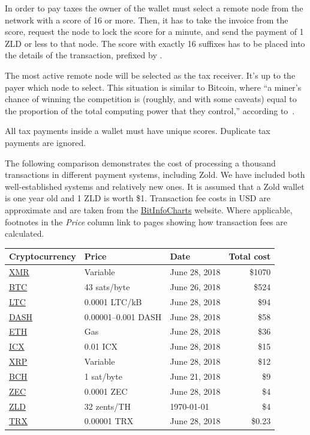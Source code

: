 \documentclass{main}
\begin{document}
In order to pay taxes the owner of the wallet must select a remote
node from the network with a score of 16 or more. Then, it has to
take the invoice from the score, request the node to lock the score
for a minute, and send the payment of 1 ZLD or less
to that node. The score with exactly 16 suffixes
has to be placed into the details of the transaction,
prefixed by .

The most active remote node will be selected as the tax receiver.
It's up to the payer which node to select. This situation is similar
to Bitcoin, where ``a miner's chance of winning the
competition is (roughly, and with some caveats) equal to the proportion of the total computing
power that they control,'' according to~\textcite{foroglou2015}.

All tax payments inside a wallet must have unique scores.
Duplicate tax payments are ignored.

The following comparison demonstrates the cost of processing a thousand transactions
in different payment systems, including Zold. We have included both well-established systems and relatively new ones.
It is assumed that a Zold wallet is one year old
and 1 ZLD is worth \$1. Transaction fee costs in USD are approximate and are taken from the \href{https://bitinfocharts.com/}{BitInfoCharts} website. Where applicable, footnotes in the \textit{Price} column link to pages showing how transaction fees are calculated.

\begin{tabular}{lllr}
\hline
Cryptocurrency & Price & Date & Total cost \\
\hline
\href{https://getmonero.org/}{XMR} &
   Variable\footnotemark &
   June 28, 2018 &
   \$1070 \\
\href{https://bitcoin.org}{BTC} &
  43 sats/byte\footnotemark &
  June 26, 2018 &
  \$524 \\
\href{https://litecoin.org/}{LTC} &
  0.0001 LTC/kB\footnotemark &
  June 28, 2018 &
  \$94 \\
\href{https://www.dash.org/}{DASH} &
  0.00001--0.001 DASH\footnotemark &
  June 28, 2018 &
  \$58 \\
\href{https://www.ethereum.org/}{ETH} &
  Gas\footnotemark &
  June 28, 2018 &
  \$36 \\
\href{https://icon.foundation/}{ICX} &
  0.01 ICX\footnotemark &
  June 28, 2018 &
  \$15 \\
\href{https://ripple.com/xrp/}{XRP} &
   Variable\footnotemark &
   June 28, 2018 &
   \$12 \\
\href{https://www.bitcoincash.org/}{BCH} &
  1 sat/byte &
  June 21, 2018 &
  \$9 \\
\href{https://z.cash/}{ZEC} &
   0.0001 ZEC\footnotemark &
   June 28, 2018 &
   \$4 \\
\href{http://www.zold.io/}{ZLD} &
  32 zents/TH &
  \today &
  \$4 \\
\href{https://tron.network/}{TRX} &
  0.00001 TRX\footnotemark &
  June 28, 2018 &
  \$0.23 \\
\hline
\end{tabular}
\end{document}

